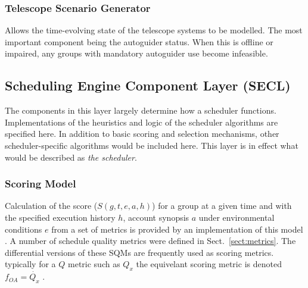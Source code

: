 \subsubsection{Telescope Scenario Generator}
\label{sect:sub_ssg}
Allows the time-evolving state of the telescope systems to be modelled. The most important component being the autoguider status. When this is offline or impaired, any groups with mandatory autoguider use become infeasible.

\subsection{Scheduling Engine Component Layer (SECL)}
The components in this layer largely determine how a scheduler functions. Implementations of the heuristics and logic of the scheduler algorithms are specified here. In addition to basic scoring and selection mechanisms, other scheduler-specific algorithms would be included here. This layer is in effect what would be described as \emph{the scheduler}. 

\subsubsection{Scoring Model}
\label{ss:scoring_model}
Calculation of the score ($S(g,t,e,a,h)$) for a group at a given time and with the specified execution history $h$, account synopsis $a$ under environmental conditions $e$ from a set of metrics is provided by an implementation of this model . A number of schedule quality metrics were defined in Sect.~\ref{sect:metrics}. The differential versions of these SQMs are frequently used as scoring metrics. typically for a $Q$ metric such as $Q_{x}$ the equivelant scoring metric is denoted $f_{OA} = \dot{Q_x}$ .


